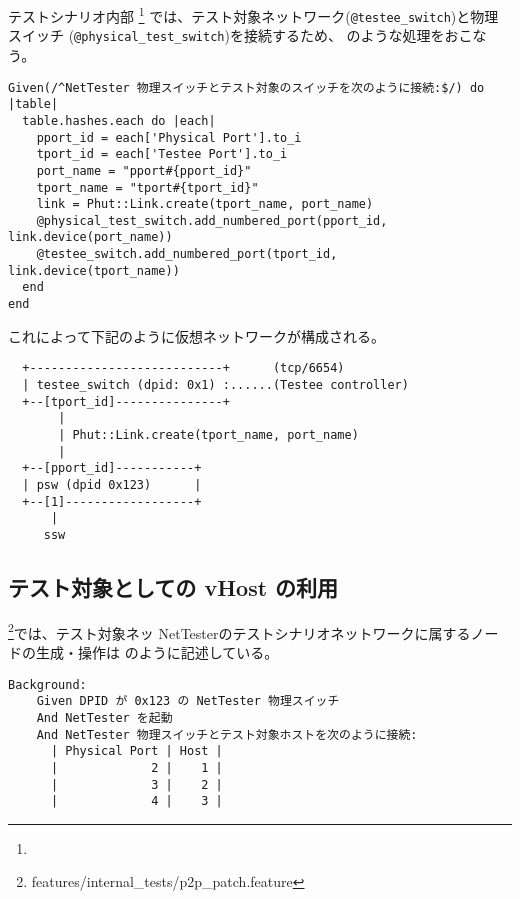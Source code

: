 テストシナリオ内部
\footnote{}
では、テスト対象ネットワーク(\verb|@testee_switch|)と物理スイッチ
(\verb|@physical_test_switch|)を接続するため、
のような処理をおこなう。

\begin{lstlisting}[caption=vSwitch間接続,label=lst:connect-vswitch]
Given(/^NetTester 物理スイッチとテスト対象のスイッチを次のように接続:$/) do |table|
  table.hashes.each do |each|
    pport_id = each['Physical Port'].to_i
    tport_id = each['Testee Port'].to_i
    port_name = "pport#{pport_id}"
    tport_name = "tport#{tport_id}"
    link = Phut::Link.create(tport_name, port_name)
    @physical_test_switch.add_numbered_port(pport_id, link.device(port_name))
    @testee_switch.add_numbered_port(tport_id, link.device(tport_name))
  end
end
\end{lstlisting}

これによって下記のように仮想ネットワークが構成される。

\begin{textbox}
\begin{verbatim}
  +---------------------------+      (tcp/6654)
  | testee_switch (dpid: 0x1) :......(Testee controller)
  +--[tport_id]---------------+
       |
       | Phut::Link.create(tport_name, port_name)
       |
  +--[pport_id]-----------+
  | psw (dpid 0x123)      |
  +--[1]------------------+
      |
     ssw
\end{verbatim}
\end{textbox}

\subsection{テスト対象としての vHost の利用}

\footnote{features/internal\_tests/p2p\_patch.feature}では、テスト対象ネッ
NetTesterのテストシナリオネットワークに属するノードの生成・操作は
のように記述している。

\begin{lstlisting}[caption=テスト用ノードの生成,label=lst:create-testnode]
  Background:
    Given DPID が 0x123 の NetTester 物理スイッチ
    And NetTester を起動
    And NetTester 物理スイッチとテスト対象ホストを次のように接続:
      | Physical Port | Host |
      |             2 |    1 |
      |             3 |    2 |
      |             4 |    3 |
\end{lstlisting}

